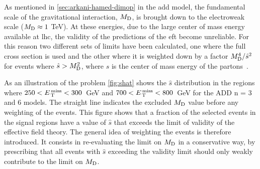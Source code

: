 As mentioned in \cref{sec:arkani-hamed-dimop} in the \gls{add} model, the
fundamental scale of the gravitational interaction, $M_\mathrm{D}$, is brought down to
the electroweak scale ($M_\mathrm{D} \approx 1~$TeV). At these energies, due to the large
center of mass energy available at \gls{lhc}, the validity of the predictions of
the \gls{eft} become unreliable. For this reason two different sets of limits
have been calculated, one where the full cross section is used and the other
where it is weighted down by a factor $M_\mathrm{D}^4/\hat{s}^2$ for events where
$\hat{s} > M_\mathrm{D}^2$, where $\hat{s}$ is the center of mass energy of the
partons~\cite{LEDWeightFactor}.

As an illustration of the problem \cref{fig:shat} shows the $\hat{s}$
distribution in the regions where $250 < E_\mathrm{\, T}^\mathrm{\, miss} < 300$~GeV and
$700 < E_\mathrm{\, T}^\mathrm{\, miss} < 800$~GeV for the ADD n = 3 and 6 models. The straight line
indicates the excluded $M_\mathrm{D}$ value before any weighting of the events. This
figure shows that a fraction of the selected events in the signal regions have a
value of $\hat{s}$ that exceeds the limit of validity of the effective field
theory. The general idea of weighting the events is therefore introduced. It
consists in re-evaluating the limit on $M_\mathrm{D}$ in a conservative way, by
prescribing that all events with $\hat{s}$ exceeding the validity limit should
only weakly contribute to the limit on $M_\mathrm{D}$.

